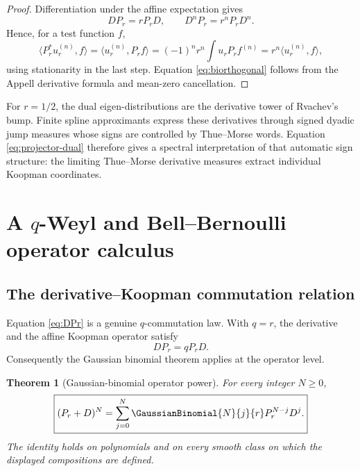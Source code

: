 \documentclass[11pt,a4paper]{article}
\newtheorem{theorem}{Theorem}[section]
\theoremstyle{definition}
\theoremstyle{remark}
\begin{document}
\begin{proof}
Differentiation under the affine expectation gives
\begin{equation}
 DP_r=rP_rD,
 \qquad D^nP_r=r^nP_rD^n.
 \label{eq:DPr}
\end{equation}
Hence, for a test function $f$,
\[
 \langle P_r^*u_r^{(n)},f\rangle
 =\langle u_r^{(n)},P_rf\rangle
 =(-1)^nr^n\int u_rP_rf^{(n)}
 =r^n\langle u_r^{(n)},f\rangle,
\]
using stationarity in the last step. Equation \eqref{eq:biorthogonal} follows from the Appell derivative formula and mean-zero cancellation.
\end{proof}

For $r=1/2$, the dual eigen-distributions are the derivative tower of Rvachev's bump. Finite spline approximants express these derivatives through signed dyadic jump measures whose signs are controlled by Thue--Morse words. Equation \eqref{eq:projector-dual} therefore gives a spectral interpretation of that automatic sign structure: the limiting Thue--Morse derivative measures extract individual Koopman coordinates.

\section{\texorpdfstring{A $q$-Weyl and Bell--Bernoulli operator calculus}{A q-Weyl and Bell--Bernoulli operator calculus}}
\label{sec:qweyl}

\subsection{The derivative--Koopman commutation relation}

Equation \eqref{eq:DPr} is a genuine $q$-commutation law. With $q=r$, the derivative and the affine Koopman operator satisfy
\begin{equation}
 DP_r=qP_rD.
 \label{eq:qcommute}
\end{equation}
Consequently the Gaussian binomial theorem applies at the operator level.

\begin{theorem}[Gaussian-binomial operator power]
\label{thm:qbinomial-operator}
For every integer $N\ge0$,
\begin{equation}
 \boxed{\displaystyle
 (P_r+D)^N
 =\sum_{j=0}^{N}\GaussianBinomial{N}{j}{r}
 P_r^{N-j}D^j.}
 \label{eq:qbinomial-operator}
\end{equation}
The identity holds on polynomials and on every smooth class on which the displayed compositions are defined.
\end{theorem}
\end{document}
